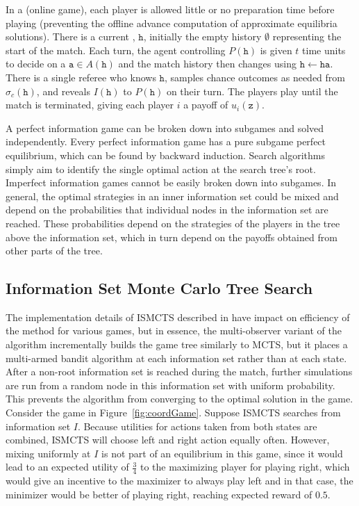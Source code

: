 \documentclass[letterpaper]{article}
\newcommand{\tta}{\mathtt{a}}
\newcommand{\tth}{\mathtt{h}}
\newcommand{\ttz}{\mathtt{z}}
\newcommand{\defword}[1]{\textbf{\boldmath{#1}}}
\begin{document}
In a \defword{match} (online game), each player is allowed little or no preparation time before playing (preventing the offline advance computation of approximate equilibria solutions).
There is a current \defword{match history}, $\tth$, initially the empty history $\emptyset$ representing the start of the match. Each turn, 
the agent controlling $P(\tth)$ is given $t$ time units to decide on a \defword{match action} $\tta \in A(\tth)$ and the 
match history then changes using $\tth \leftarrow \tth \tta$. There is a single referee who knows $\tth$, samples chance outcomes 
as needed from $\sigma_c(\tth)$, and reveals $I(\tth)$ to $P(\tth)$ on their turn. The players play until the match is terminated, 
giving each player $i$ a payoff of $u_i(\ttz)$.


A perfect information game can be broken down into subgames and solved independently. 
Every perfect information game has a pure subgame perfect equilibrium, which can be found by backward induction. 
Search algorithms simply aim to identify the single optimal action at the search tree's root. 
Imperfect information games cannot be easily broken down into subgames. In general, the optimal strategies in an inner 
information set could be mixed and depend on the probabilities that individual nodes in the information set are 
reached. These probabilities depend on the strategies of the players in the tree above the information set, which in 
turn depend on the payoffs obtained from other parts of the tree. 


\subsection{Information Set Monte Carlo Tree Search}

The implementation details of ISMCTS described in \cite{Cowling12ISMCTS} have impact on efficiency of the method for various games, but in essence, the multi-observer variant of the algorithm incrementally builds the game tree similarly to MCTS, but it places a multi-armed bandit algorithm at each information set rather than at each state. After a non-root information set is reached during the match, further simulations are run from a random node in this information set with uniform probability. This prevents the algorithm from converging to the optimal solution in the game.
Consider the game in Figure~\ref{fig:coordGame}.
Suppose ISMCTS searches from information set $I$. Because utilities for actions taken from both states are combined, ISMCTS will choose left and right action equally often. However, mixing uniformly at $I$ is not part of an equilibrium in this game, since it would lead to an expected utility of $\frac{3}{4}$ to the maximizing player for playing right, which would give an incentive to the maximizer to always play left and in that case, the minimizer would be better of playing right, reaching expected reward of $0.5$.
\end{document}
